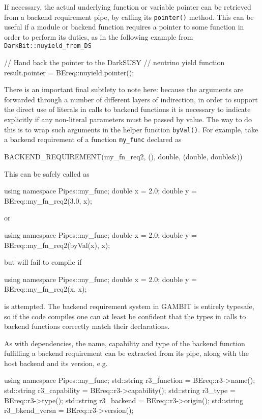 \documentclass[pdftex,twocolumn,epjc3_preprint,runningheads]{svjour3}
\renewcommand{\_}{\discretionary{\underscore}{}{\underscore}}
\newcommand{\gambit}{\textsf{GAMBIT}\xspace}
\newcommand{\GB}{\gambit}
\begin{document}
If necessary, the actual underlying function or variable pointer can be retrieved from a backend requirement pipe, by calling its \lstinline{pointer()} method.  This can be useful if a module or backend function requires a pointer to some function in order to perform its duties, as in the following example from \lstinline{DarkBit::nuyield_from_DS}
\begin{lstcpp}
// Hand back the pointer to the DarkSUSY
// neutrino yield function
result.pointer = BEreq::nuyield.pointer();
\end{lstcpp}

There is an important final subtlety to note here: because the arguments are forwarded through a number of different layers of indirection, in order to support the direct use of literals in calls to backend functions it is necessary to indicate explicitly if any non-literal parameters must be passed by value.  The way to do this is to wrap such arguments in the helper function \lstinline{byVal()}.  For example, take a backend requirement of a function \lstinline{my_func} declared as
\begin{lstcpp}
BACKEND_REQUIREMENT(my_fn_req2, (), double,
 (double, double&))
\end{lstcpp}
This can be safely called as
\begin{lstcpp}
using namespace Pipes::my_func;
double x = 2.0;
double y = BEreq::my_fn_req2(3.0, x);
\end{lstcpp}
or
\begin{lstcpp}
using namespace Pipes::my_func;
double x = 2.0;
double y = BEreq::my_fn_req2(byVal(x), x);
\end{lstcpp}
but will fail to compile if
\begin{lstcpp}
using namespace Pipes::my_func;
double x = 2.0;
double y = BEreq::my_fn_req2(x, x);
\end{lstcpp}
is attempted.  The backend requirement system in \GB is entirely typesafe, so if the code compiles one can at least be confident that the types in calls to backend functions correctly match their declarations.

As with dependencies, the name, capability and type of the backend function fulfilling a backend requirement can be extracted from its pipe, along with the host backend and its version, e.g.
\begin{lstcpp}
using namespace Pipes::my_func;
std::string r3_function    = BEreq::r3->name();
std::string r3_capability  =
 BEreq::r3->capability();
std::string r3_type        = BEreq::r3->type();
std::string r3_backend     = BEreq::r3->origin();
std::string r3_bkend_versn = BEreq::r3->version();
\end{lstcpp}
\end{document}
